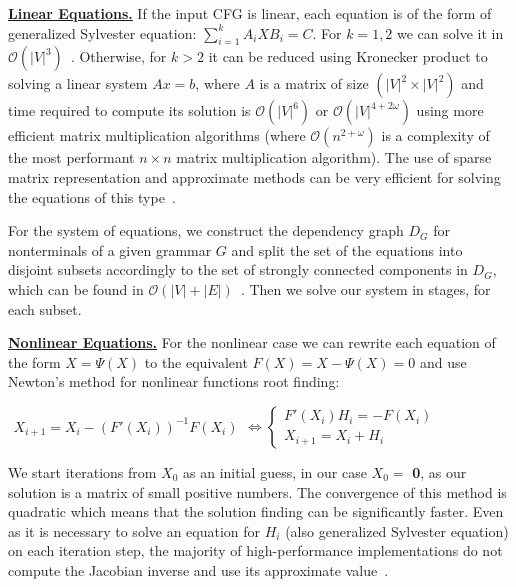 \documentclass[sigconf]{acmart}
\begin{document}
\underline{\textbf{Linear Equations.}}
If the input CFG is linear, each equation is of the form of generalized Sylvester equation: $\sum_{i = 1}^{k} A_iXB_i = C$.
For $k = 1, 2$ we can solve it in $\mathcal{O}(|V|^3)$~\cite{Bartels:1972:SME:361573.361582}.
Otherwise, for $k > 2$ it can be reduced using Kronecker product to solving a linear system $Ax = b$, where $A$ is a matrix of size $(|V|^2 \times |V|^2)$ and time required to compute its solution is $\mathcal{O}(|V|^6)$ or $\mathcal{O}(|V|^{4 + 2\omega})$ using more efficient matrix multiplication algorithms (where $\mathcal{O}(n^{2+\omega})$ is a complexity of the most performant $n\times n$ matrix multiplication algorithm).
The use of sparse matrix representation and approximate methods can be very efficient for solving the equations of this type~\cite{bouhamidi2008}.

For the system of equations, we construct the dependency graph $D_G$ for nonterminals of a given grammar $G$ and split the set of the equations into disjoint subsets accordingly to the set of strongly connected components in $D_G$, which can be found in $\mathcal{O}(|V| + |E|)$~\cite{tarjan1972}.
Then we solve our system in stages, for each subset.

\underline{\textbf{Nonlinear Equations.}}
For the nonlinear case we can rewrite each equation of the form $X = \Psi(X)$ to the equivalent $F(X) = X - \Psi(X) = 0$ and use Newton's method for nonlinear functions root finding:

\begin{center}

\(
\left.
\begin{array}{l}
X_{i+1} = X_i - (F'(X_i))^{-1}F(X_i)
\end{array}
\right.
\iff
\left\{
\begin{array}{l}
F'(X_i)H_i = - F(X_i) \\
X_{i+1} = X_i + H_i
\end{array}
\right.
\)
\end{center}

We start iterations from $X_0$ as an initial guess, in our case $X_0 = $ \textbf{0}, as our solution is a matrix of small positive numbers.
The convergence of this method is quadratic which means that the solution finding can be significantly faster.
Even as it is necessary to solve an equation for $H_i$ (also generalized Sylvester equation) on each iteration step, the majority of high-performance implementations do not compute the Jacobian inverse and use its approximate value~\cite{knoll2004jacobian}.
\end{document}
